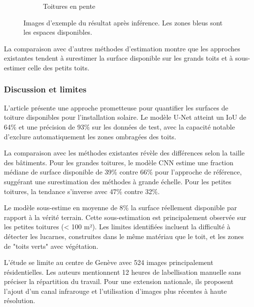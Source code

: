 \begin{figure}[H]
\begin{subfigure}{0.43\textwidth}
        \caption{Toitures en pente}
        \label{fig:castello_quantification_image_resultat2}
    \end{subfigure}
    \caption{Images d'exemple \cite{castello_quantification_2021} du résultat après inférence. Les zones bleus sont les espaces disponibles.}
    \label{fig:castello_quantification_image_resultat}
\end{figure}

\par{La comparaison avec d'autres méthodes d'estimation montre que les approches existantes tendent à surestimer la surface disponible sur les grands toits et à sous-estimer celle des petits toits.}

\subsubsection{Discussion et limites}
\par{L'article présente une approche prometteuse pour quantifier les surfaces de toiture disponibles pour l'installation solaire. Le modèle U-Net atteint un IoU de 64\% et une précision de 93\% sur les données de test, avec la capacité notable d'exclure automatiquement les zones ombragées des toits.}
\par{La comparaison avec les méthodes existantes révèle des différences selon la taille des bâtiments. Pour les grandes toitures, le modèle CNN estime une fraction médiane de surface disponible de 39\% contre 66\% pour l'approche de référence, suggérant une surestimation des méthodes à grande échelle. Pour les petites toitures, la tendance s'inverse avec 47\% contre 32\%.}
\par{Le modèle sous-estime en moyenne de 8\% la surface réellement disponible par rapport à la vérité terrain. Cette sous-estimation est principalement observée sur les petites toitures (< 100 m²). Les limites identifiées incluent la difficulté à détecter les lucarnes, construites dans le même matériau que le toit, et les zones de "toits verts" avec végétation.}
\par{L'étude se limite au centre de Genève avec 524 images principalement résidentielles. Les auteurs mentionnent 12 heures de labellisation manuelle sans préciser la répartition du travail. Pour une extension nationale, ils proposent l'ajout d'un canal infrarouge et l'utilisation d'images plus récentes à haute résolution.}


